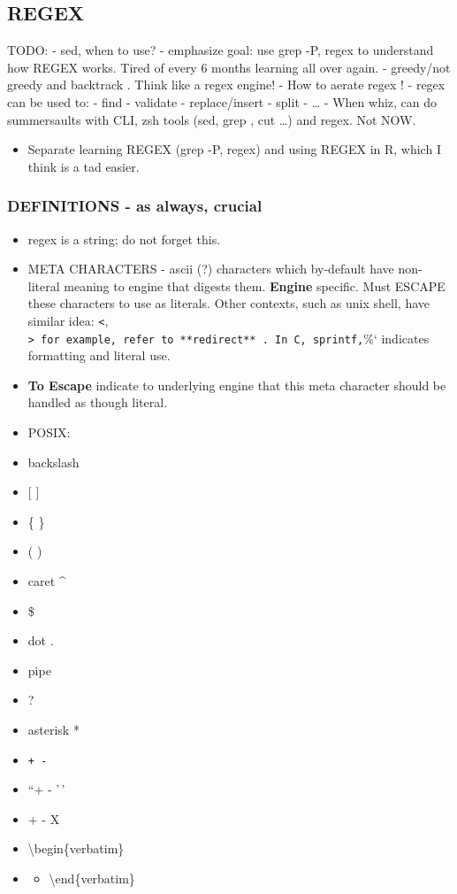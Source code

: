 \documentclass[
  letterpaper,
  DIV=11,
  numbers=noendperiod]{scrartcl}
\providecommand{\tightlist}{%
  \setlength{\itemsep}{0pt}\setlength{\parskip}{0pt}}\usepackage{longtable,booktabs,array}
\begin{document}
\subsection{REGEX}\label{regex}

TODO: - sed, when to use? - emphasize goal: use grep -P, regex to
understand how REGEX works. Tired of every 6 months learning all over
again. - greedy/not greedy and backtrack . Think like a regex engine! -
How to aerate regex ! - regex can be used to: - find - validate -
replace/insert - split - \ldots{} - When whiz, can do summersaults with
CLI, zsh tools (sed, grep , cut \ldots) and regex. Not NOW.

\begin{itemize}
\tightlist
\item
  Separate learning REGEX (grep -P, regex) and using REGEX in R, which I
  think is a tad easier.
\end{itemize}

\subsubsection{DEFINITIONS - as always,
crucial}\label{definitions---as-always-crucial}

\begin{itemize}
\item
  regex is a string; do not forget this.
\item
  META CHARACTERS - ascii (?) characters which by-default have
  non-literal meaning to engine that digests them. \textbf{Engine}
  specific. Must ESCAPE these characters to use as literals. Other
  contexts, such as unix shell, have similar idea: \texttt{\textless{}},
  \texttt{\textgreater{}\textquotesingle{}\ for\ example,\ refer\ to\ **redirect**\ .\ In\ C,\ sprintf,}\%`
  indicates formatting and literal use.
\item
  \textbf{To Escape} indicate to underlying engine that this meta
  character should be handled as though literal.
\item
  POSIX:
\item
  backslash\\
\item
  {[} {]}
\item
  \{ \}
\item
  ( )
\item
  caret \^{}
\item
  \$
\item
  dot .
\item
  pipe \textbar{}
\item
  ?
\item
  asterisk *
\item
  \texttt{+\ -}
\item
  ``+ - '\,'
\item
  \verbX + - X
\item
  \textbackslash begin\{verbatim\}
\item
  \begin{itemize}
  \tightlist
  \item
    \textbackslash end\{verbatim\}
  \end{itemize}
\end{itemize}
\end{document}
